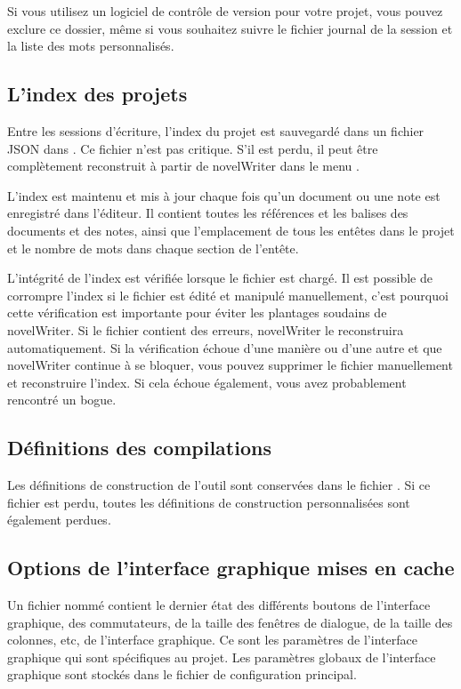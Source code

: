 \documentclass[a4paper,11pt,french]{sphinxmanual}
\begin{document}
\sphinxAtStartPar
Si vous utilisez un logiciel de contrôle de version pour votre projet, vous pouvez exclure ce dossier, même si vous souhaitez suivre le fichier journal de la session et la liste des mots personnalisés.


\subsection{L’index des projets}
\label{\detokenize{tech_storage:the-project-index}}
\sphinxAtStartPar
Entre les sessions d’écriture, l’index du projet est sauvegardé dans un fichier JSON dans . Ce fichier n’est pas critique. S’il est perdu, il peut être complètement reconstruit à partir de novelWriter dans le menu .

\sphinxAtStartPar
L’index est maintenu et mis à jour chaque fois qu’un document ou une note est enregistré dans l’éditeur. Il contient toutes les références et les balises des documents et des notes, ainsi que l’emplacement de tous les en\sphinxhyphen{}têtes dans le projet et le nombre de mots dans chaque section de l’en\sphinxhyphen{}tête.

\sphinxAtStartPar
L’intégrité de l’index est vérifiée lorsque le fichier est chargé. Il est possible de corrompre l’index si le fichier est édité et manipulé manuellement, c’est pourquoi cette vérification est importante pour éviter les plantages soudains de novelWriter. Si le fichier contient des erreurs, novelWriter le reconstruira automatiquement. Si la vérification échoue d’une manière ou d’une autre et que novelWriter continue à se bloquer, vous pouvez supprimer le fichier manuellement et reconstruire l’index. Si cela échoue également, vous avez probablement rencontré un bogue.


\subsection{Définitions des compilations}
\label{\detokenize{tech_storage:build-definitions}}
\sphinxAtStartPar
Les définitions de construction de l’outil  sont conservées dans le fichier . Si ce fichier est perdu, toutes les définitions de construction personnalisées sont également perdues.


\subsection{Options de l’interface graphique mises en cache}
\label{\detokenize{tech_storage:cached-gui-options}}
\sphinxAtStartPar
Un fichier nommé  contient le dernier état des différents boutons de l’interface graphique, des commutateurs, de la taille des fenêtres de dialogue, de la taille des colonnes, etc, de l’interface graphique. Ce sont les paramètres de l’interface graphique qui sont spécifiques au projet. Les paramètres globaux de l’interface graphique sont stockés dans le fichier de configuration principal.
\end{document}

